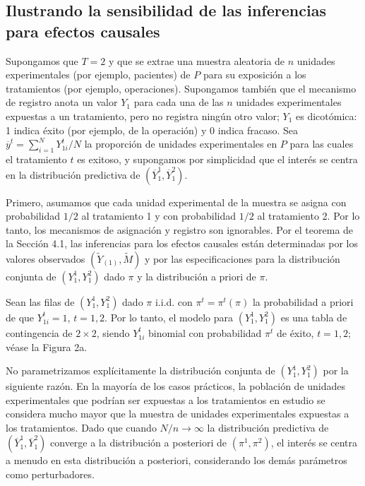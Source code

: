 \documentclass[12pt,a4paper]{article}
\begin{document}
\subsection{Ilustrando la sensibilidad de las inferencias para efectos causales}

Supongamos que $T=2$ y que se extrae una muestra aleatoria de $n$ unidades experimentales (por ejemplo, pacientes) de $P$ para su exposición a los tratamientos (por ejemplo, operaciones). Supongamos también que el mecanismo de registro anota un valor $Y_1$ para cada una de las $n$ unidades experimentales expuestas a un tratamiento, pero no registra ningún otro valor; $Y_1$ es dicotómica: 1 indica éxito (por ejemplo, de la operación) y 0 indica fracaso. Sea $\overline{y}^t = \sum_{i=1}^N Y_{1i}^t / N$ la proporción de unidades experimentales en $P$ para las cuales el tratamiento $t$ es exitoso, y supongamos por simplicidad que el interés se centra en la distribución predictiva de $(\overline{Y}_1^1, \overline{Y}_1^2)$.

Primero, asumamos que cada unidad experimental de la muestra se asigna con probabilidad $1/2$ al tratamiento 1 y con probabilidad $1/2$ al tratamiento 2. Por lo tanto, los mecanismos de asignación y registro son ignorables. Por el teorema de la Sección 4.1, las inferencias para los efectos causales están determinadas por los valores observados $(\tilde{Y}_{(1)}, \tilde{M})$ y por las especificaciones para la distribución conjunta de $(Y_1^1, Y_1^2)$ dado $\pi$ y la distribución a priori de $\pi$.

Sean las filas de $(Y_1^1, Y_1^2)$ dado $\pi$ i.i.d. con $\pi^t = \pi^t(\pi)$ la probabilidad a priori de que $Y_{1i}^t = 1$, $t=1, 2$. Por lo tanto, el modelo para $(Y_1^1, Y_1^2)$ es una tabla de contingencia de $2 \times 2$, siendo $Y_{1i}^t$ binomial con probabilidad $\pi^t$ de éxito, $t=1, 2$; véase la Figura 2a.

No parametrizamos explícitamente la distribución conjunta de $(Y_1^1, Y_1^2)$ por la siguiente razón. En la mayoría de los casos prácticos, la población de unidades experimentales que podrían ser expuestas a los tratamientos en estudio se considera mucho mayor que la muestra de unidades experimentales expuestas a los tratamientos. Dado que cuando $N/n \rightarrow \infty$ la distribución predictiva de $(\overline{Y}_1^1, \overline{Y}_1^2)$ converge a la distribución a posteriori de $(\pi^1, \pi^2)$, el interés se centra a menudo en esta distribución a posteriori, considerando los demás parámetros como perturbadores.
\end{document}
